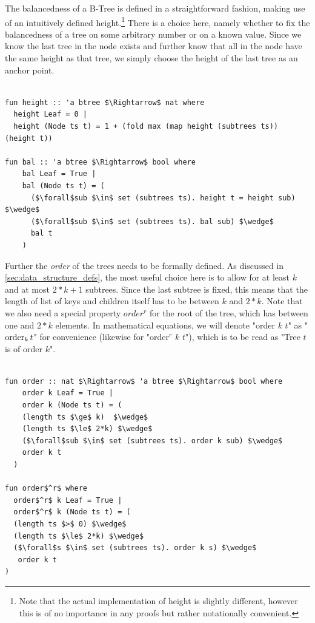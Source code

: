 The balancedness of a B-Tree is defined in a straightforward fashion, making use
of an intuitively defined height.\footnote{
    Note that the actual implementation of height is slightly different,
    however this is of no importance in any proofs but rather notationally convenient.
}
There is a choice here, namely whether to fix the balancedness of a tree
on some arbitrary number or on a known value.
Since we know the last tree in the node exists and further
know that all in the node have the same height as that tree,
we simply choose the height of the last tree as an anchor point.

\begin{lstlisting}[mathescape=true, language=Isabelle]

fun height :: 'a btree $\Rightarrow$ nat where
  height Leaf = 0 |
  height (Node ts t) = 1 + (fold max (map height (subtrees ts)) (height t))

fun bal :: 'a btree $\Rightarrow$ bool where
    bal Leaf = True |
    bal (Node ts t) = (
      ($\forall$sub $\in$ set (subtrees ts). height t = height sub) $\wedge$
      ($\forall$sub $\in$ set (subtrees ts). bal sub) $\wedge$
      bal t
    )
\end{lstlisting}

Further the \textit{order} of the trees needs to be formally defined.
As discussed in \autoref{sec:data_structure_defs}, the most useful choice here is
to allow for at least $k$ and at most $2*k+1$ subtrees.
Since the last subtree is fixed, this means that the length of list of keys and children
itself has to be between $k$ and $2*k$.
Note that we also need a special property $order^r$ for the root of the tree,
which has between one and $2*k$ elements.
In mathematical equations, we will denote "order $k$ $t$" as "$\operatorname{order}_k t$"
for convenience (likewise for "order$^r$ $k$ $t$"), which is to be read as
"Tree $t$ is of order $k$".

\begin{lstlisting}[mathescape=true, language=Isabelle]

fun order :: nat $\Rightarrow$ 'a btree $\Rightarrow$ bool where
    order k Leaf = True |
    order k (Node ts t) = (
    (length ts $\ge$ k)  $\wedge$
    (length ts $\le$ 2*k) $\wedge$
    ($\forall$sub $\in$ set (subtrees ts). order k sub) $\wedge$
    order k t
  )

fun order$^r$ where
  order$^r$ k Leaf = True |
  order$^r$ k (Node ts t) = (
  (length ts $>$ 0) $\wedge$
  (length ts $\le$ 2*k) $\wedge$
  ($\forall$s $\in$ set (subtrees ts). order k s) $\wedge$
   order k t
)

\end{lstlisting}

